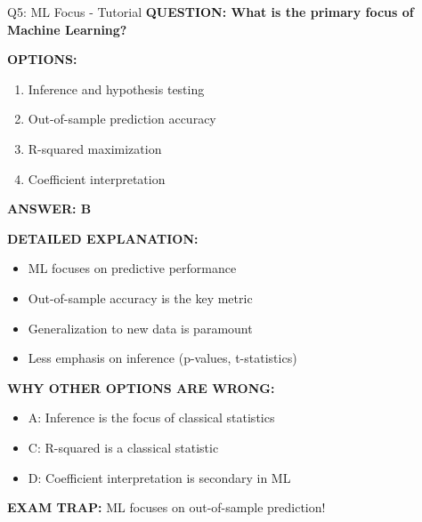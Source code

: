 \documentclass[8pt]{beamer}
\begin{document}
	\begin{frame}{Q5: ML Focus - Tutorial}
		\fontsize{6.5}{7.5}\selectfont
		\textbf{QUESTION: What is the primary focus of Machine Learning?}
		
		\vspace{0.1cm}
		\textbf{OPTIONS:}
		\begin{enumerate}
			\item Inference and hypothesis testing
			\item Out-of-sample prediction accuracy
			\item R-squared maximization
			\item Coefficient interpretation
		\end{enumerate}
		
		\vspace{0.1cm}
		\textcolor{myblue}{\textbf{ANSWER: B}}
		
		\vspace{0.1cm}
		\textbf{DETAILED EXPLANATION:}
		\begin{itemize}
			\item ML focuses on predictive performance
			\item Out-of-sample accuracy is the key metric
			\item Generalization to new data is paramount
			\item Less emphasis on inference (p-values, t-statistics)
		\end{itemize}
		
		\vspace{0.1cm}
		\textcolor{myred}{\textbf{WHY OTHER OPTIONS ARE WRONG:}}
		\begin{itemize}
			\item \textcolor{myred}{A:} Inference is the focus of classical statistics
			\item \textcolor{myred}{C:} R-squared is a classical statistic
			\item \textcolor{myred}{D:} Coefficient interpretation is secondary in ML
		\end{itemize}
		
		\textcolor{myred}{\textbf{EXAM TRAP:}} ML focuses on \textcolor{myblue}{out-of-sample prediction}!
	\end{frame}
	
\end{document}
